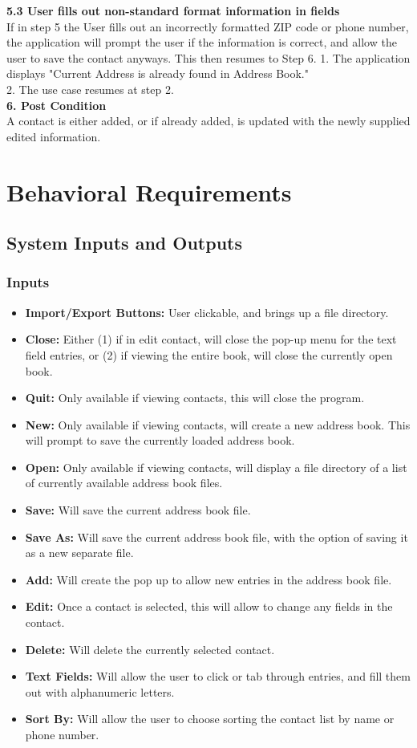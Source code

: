 \documentclass[a4paper, 11pt]{article}
\newcommand\tab[1][1cm]{\hspace*{#1}}
\begin{document}
{\begin{minipage}{41em}
		\large \textbf{5.3 User fills out non-standard format information in fields}\\
		If in step 5 the User fills out an incorrectly formatted ZIP code or phone number, the application will prompt the user if the information is correct, and allow the user to save the contact anyways. This then resumes to Step 6.
		\tab 1. The application displays "Current Address is already found in Address Book."\\
		\tab 2. The use case resumes at step 2. \\
		\large \textbf{6. Post Condition}\\
		A contact is either added, or if already added, is updated with the newly supplied edited information.
		
\end{minipage}}


\section{Behavioral Requirements}
\subsection{System Inputs and Outputs}
\subsubsection{Inputs}
\begin{itemize}
	\item \textbf{Import/Export Buttons: }User clickable, and brings up a file directory.
	\item \textbf{Close: }Either (1) if in edit contact, will close the pop-up menu for the text field entries, or (2) if viewing the entire book, will close the currently open book.
	\item \textbf{Quit: }Only available if viewing contacts, this will close the program.
	\item \textbf{New: }Only available if viewing contacts, will create a new address book. This will prompt to save the currently loaded address book.
	\item \textbf{Open: }Only available if viewing contacts, will display a file directory of a list of currently available address book files.
	\item \textbf{Save: }Will save the current address book file.
	\item \textbf{Save As: }Will save the current address book file, with the option of saving it as a new separate file.
	\item \textbf{Add: }Will create the pop up to allow new entries in the address book file.
	\item \textbf{Edit: }Once a contact is selected, this will allow to change any fields in the contact.
	\item \textbf{Delete: }Will delete the currently selected contact.
	\item \textbf{Text Fields: }Will allow the user to click or tab through entries, and fill them out with alphanumeric letters.
	\item \textbf{Sort By: }Will allow the user to choose sorting the contact list by name or phone number.
\end{itemize}
\end{document}
